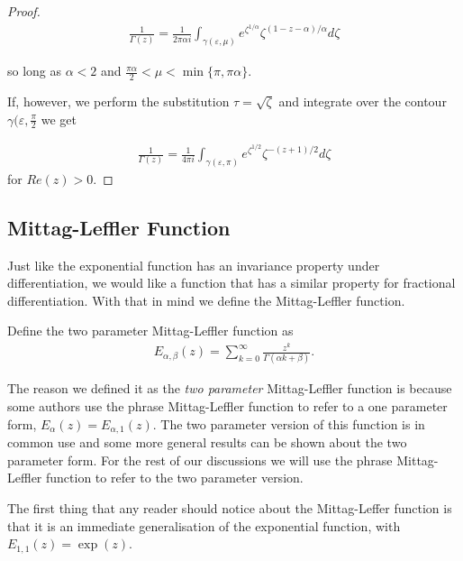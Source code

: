 \begin{proof}
\begin{align*}
    \frac{1}{\Gamma(z)} = \frac{1}{2 \pi \alpha i} \int_{\gamma(\varepsilon, \mu)} 
			  e^{\zeta^{1 / \alpha}} \zeta^{(1-z-\alpha) / \alpha} d\zeta 
\end{align*}

so long as $ \alpha < 2 $ and $ \frac{\pi \alpha}{2} < \mu < \min\{ \pi, \pi \alpha \} $.

If, however, we perform the substitution $ \tau = \sqrt{\zeta} $ and integrate over the contour $ \gamma(\varepsilon, \frac{\pi}{2} $ we get

\begin{align*}
    \frac{1}{\Gamma(z)} = \frac{1}{4 \pi i} \int_{\gamma(\varepsilon, \pi)} e^{\zeta^{1 / 2}} \zeta^{-(z + 1) / 2} d\zeta
\end{align*}
for $ Re(z) > 0 $.

\end{proof}



\subsection{Mittag-Leffler Function}

Just like the exponential function has an invariance property under differentiation, we would like a function that has a similar property for fractional differentiation. With that in mind we define the Mittag-Leffler function.
\begin{mdframed}[innertopmargin=10pt]
\begin{definition}
    Define the two parameter Mittag-Leffler function as
    \begin{align*}
        E_{\alpha, \beta}(z) = \sum_{k=0}^\infty \frac{z^k}{\Gamma(\alpha k + \beta)}.
    \end{align*}
\end{definition}
\end{mdframed}
The reason we defined it as the \emph{two parameter} Mittag-Leffler function is because some authors use the phrase Mittag-Leffler function to refer to a one parameter form, $ E_{\alpha}(z) = E_{\alpha, 1}(z) $. The two parameter version of this function is in common use and some more general results can be shown about the two parameter form. For the rest of our discussions we will use the phrase Mittag-Leffler function to refer to the two parameter version.

The first thing that any reader should notice about the Mittag-Leffer function is that it is an immediate generalisation of the exponential function, with $ E_{1, 1}(z) = \exp(z) $. 

